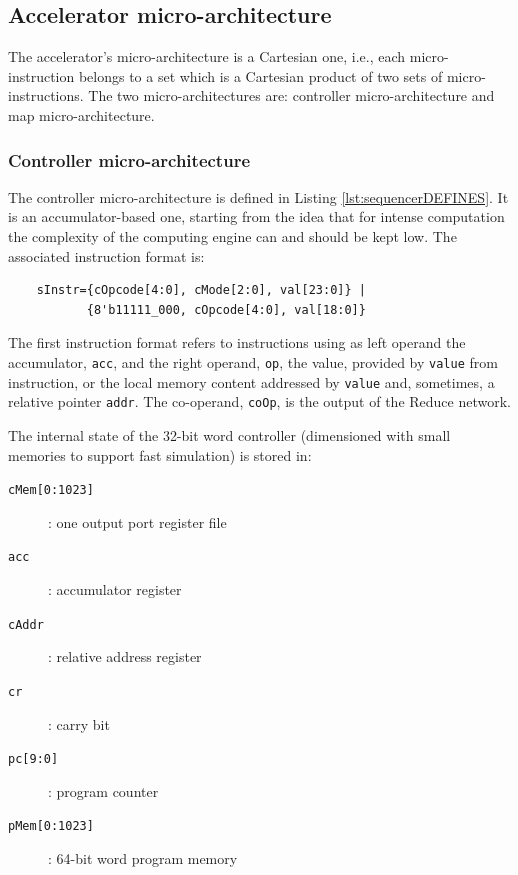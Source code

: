 
\subsection{Accelerator micro-architecture}

The accelerator's micro-architecture is a Cartesian one, i.e., each micro-instruction belongs to a set which is a Cartesian product of two sets of micro-instructions. The two micro-architectures are: controller micro-architecture and map micro-architecture. 

\subsubsection{Controller micro-architecture}

The controller micro-architecture is defined in Listing \ref{lst:sequencerDEFINES}. It is an accumulator-based one, starting from the idea that for intense computation the complexity of the computing engine can and should be kept low.  The associated instruction format is: 
\begin{verbatim}
    sInstr={cOpcode[4:0], cMode[2:0], val[23:0]} | 
           {8'b11111_000, cOpcode[4:0], val[18:0]}
\end{verbatim}
The first instruction format refers to instructions using as left operand the accumulator, {\tt acc},  and the right operand, {\tt op}, the value, provided by {\tt value} from instruction, or the local memory content addressed by {\tt value} and, sometimes, a relative pointer {\tt addr}. The co-operand, {\tt coOp}, is the output of the Reduce network.

The internal state of the 32-bit word controller (dimensioned with small memories to support fast simulation) is stored in:
\begin{description}
    \item[{\tt cMem[0:1023]}]: one output port register file
    \item[{\tt acc}]: accumulator register
    \item[{\tt cAddr}]: relative address register
    \item[{\tt cr}]: carry bit
    \item[{\tt pc[9:0]}]: program counter
    \item[{\tt pMem[0:1023]}]: 64-bit word program memory
\end{description}

